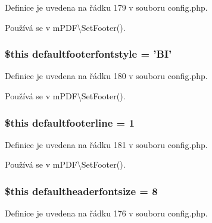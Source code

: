 Definice je uvedena na řádku 179 v souboru config.\-php.



Používá se v m\-P\-D\-F\textbackslash{}\-Set\-Footer().

\hypertarget{config_8php_ad3eb3a529bacf404886ef883fd302409}{
\subsubsection[{defaultfooterfontstyle}]{\setlength{\rightskip}{0pt plus 5cm}\$this defaultfooterfontstyle = 'B\-I'}}\label{config_8php_ad3eb3a529bacf404886ef883fd302409}


Definice je uvedena na řádku 180 v souboru config.\-php.



Používá se v m\-P\-D\-F\textbackslash{}\-Set\-Footer().

\hypertarget{config_8php_add5199377de392dea91abf4872cb208f}{
\subsubsection[{defaultfooterline}]{\setlength{\rightskip}{0pt plus 5cm}\$this defaultfooterline = 1}}\label{config_8php_add5199377de392dea91abf4872cb208f}


Definice je uvedena na řádku 181 v souboru config.\-php.



Používá se v m\-P\-D\-F\textbackslash{}\-Set\-Footer().

\hypertarget{config_8php_af0538a4cd39d6b29631562f6cf6ad0d1}{
\subsubsection[{defaultheaderfontsize}]{\setlength{\rightskip}{0pt plus 5cm}\$this defaultheaderfontsize = 8}}\label{config_8php_af0538a4cd39d6b29631562f6cf6ad0d1}


Definice je uvedena na řádku 176 v souboru config.\-php.



